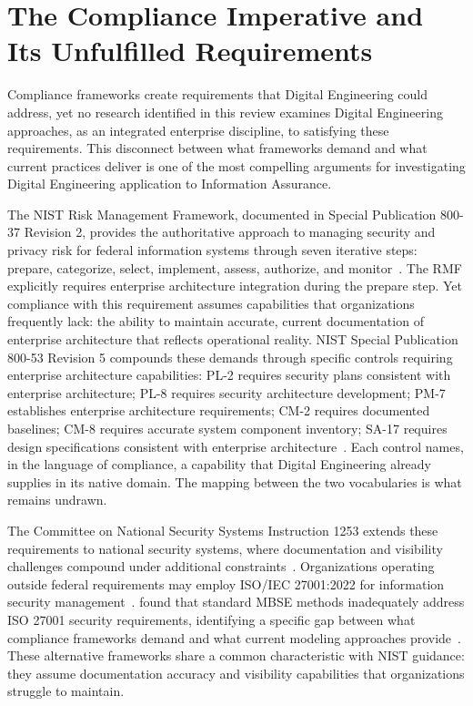 \section{The Compliance Imperative and Its Unfulfilled Requirements}\label{sec:compliance_imperative}

Compliance frameworks create requirements that Digital Engineering could address, yet no research identified in this review examines Digital Engineering approaches, as an integrated enterprise discipline, to satisfying these requirements. This disconnect between what frameworks demand and what current practices deliver is one of the most compelling arguments for investigating Digital Engineering application to Information Assurance.

The NIST Risk Management Framework, documented in Special Publication 800-37 Revision 2, provides the authoritative approach to managing security and privacy risk for federal information systems through seven iterative steps: prepare, categorize, select, implement, assess, authorize, and monitor~\parencite{NIST_SP_800_37_R2_2018}. The RMF explicitly requires enterprise architecture integration during the prepare step. Yet compliance with this requirement assumes capabilities that organizations frequently lack: the ability to maintain accurate, current documentation of enterprise architecture that reflects operational reality. NIST Special Publication 800-53 Revision 5 compounds these demands through specific controls requiring enterprise architecture capabilities: PL-2 requires security plans consistent with enterprise architecture; PL-8 requires security architecture development; PM-7 establishes enterprise architecture requirements; CM-2 requires documented baselines; CM-8 requires accurate system component inventory; SA-17 requires design specifications consistent with enterprise architecture~\parencite{Force_2020}. Each control names, in the language of compliance, a capability that Digital Engineering already supplies in its native domain. The mapping between the two vocabularies is what remains undrawn.

The Committee on National Security Systems Instruction 1253 extends these requirements to national security systems, where documentation and visibility challenges compound under additional constraints~\parencite{CNSSI_1253_2022}. Organizations operating outside federal requirements may employ ISO/IEC 27001:2022 for information security management~\parencite{ISO27001-2023}. \citeauthor{Mazeika_Butleris_2020} found that standard MBSE methods inadequately address ISO 27001 security requirements, identifying a specific gap between what compliance frameworks demand and what current modeling approaches provide~\parencite{Mazeika_Butleris_2020}. These alternative frameworks share a common characteristic with NIST guidance: they assume documentation accuracy and visibility capabilities that organizations struggle to maintain.

